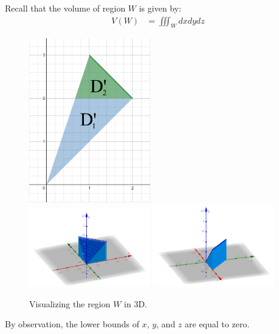 \begin{solution}
    Recall that the volume of region \(W\) is given by:
    \begin{align}
        V(W) &= \iiint_W dxdydz
    \end{align}
    
    \begin{figure}[h!]
        \centering
        \includegraphics[width=0.47\textwidth]{Pictures/Tutorial 5-4.png} \\
        \includegraphics[width=0.47\textwidth]{Pictures/Tutorial 5-5.png} 
        \includegraphics[width=0.47\textwidth]{Pictures/Tutorial 5-6.png}
        \caption{Visualizing the region \(W\) in 3D.}
    \end{figure}
    
    By observation, the lower bounds of \(x\), \(y\), and \(z\) are equal to zero.
    

\end{solution}
